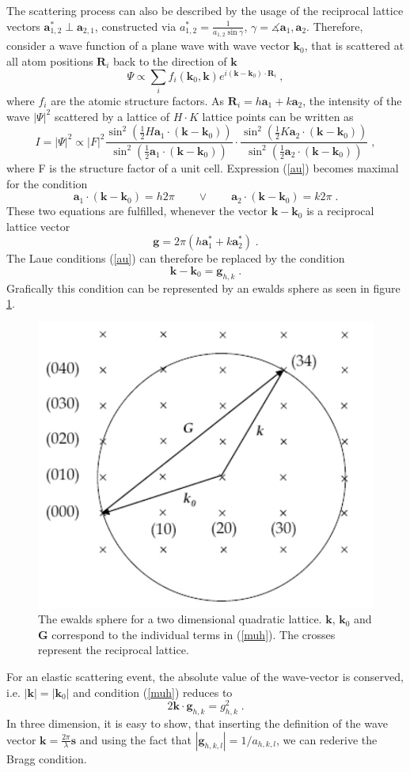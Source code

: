 \documentclass[a4paper]{scrartcl}
\numberwithin{equation}{section}
\numberwithin{figure}{section}
\numberwithin{table}{section}
\newcommand{\eq}[2]{\begin{equation}#1\label{#2}\end{equation}}
\newcommand{\Formel}[1]{(\ref{#1})}
\newcommand{\ve}[1]{\mathbf{ #1} }
\begin{document}
The scattering process can also be described by the usage of the reciprocal lattice vectors $\ve a_{1,2}^* \perp \ve a_{2,1}$, constructed via
$a_{1,2}^*=\frac{1}{a_{1,2} \sin \gamma} $, $\gamma = \measuredangle \ve a_1, \ve a_2 $. Therefore, consider a wave function of a plane wave with wave vector $\ve k_0$, that is scattered at all atom positions $\ve R_i$ back to the direction of $\ve k$ 
\eq{\Psi \propto \sum_{i} f_i(\ve k_0, \ve k) e^{i(\ve k - \ve k_0) \cdot \ve R_i} \ ,}{}
where $f_i$ are the atomic structure factors. As $\ve R_i=h \ve a_1 + k \ve a_2$, the intensity of the wave $|\Psi|^2$ scattered by a lattice of $H \cdot K$ lattice points can be written as
\eq{I=|\Psi|^2 \propto |F|^2 \frac{\sin^2 \left( \tfrac 1 2 H \ve a_1 \cdot (\ve k - \ve k_0) \right)}{\sin^2 \left( \tfrac 1 2 \ve a_1 \cdot ( \ve k - \ve k_0 ) \right)} \cdot \frac{\sin^2 \left( \tfrac 1 2 K \ve a_2 \cdot (\ve k - \ve k_0) \right)} {\sin^2 \left( \tfrac 1 2 \ve a_2 \cdot ( \ve k - \ve k_0 ) \right)} \; , } {au}
where F is the structure factor of a unit cell. Expression \Formel{au} becomes  maximal for the condition
\eq{\ve a_1 \cdot (\ve k - \ve k_0) = h 2 \pi \qquad \vee \qquad \ve a_2 \cdot (\ve k - \ve k_0) = k 2 \pi \;.}{}
These two equations are fulfilled, whenever the vector $\ve k - \ve k_0$ is a reciprocal lattice vector
\eq{\ve g = 2 \pi (h \ve a_1^{*} + k \ve a_2^*) \; .}{}
The Laue conditions \Formel{au} can therefore be replaced by the condition
\eq{\ve k - \ve k_0 =\ve g_{h,k} \;.}{muh}
Grafically this condition can be represented by an ewalds sphere as seen in figure \ref{fig:ewald}.
\begin{figure}
  \centering
   	\includegraphics[width=0.5\linewidth]{pic/ewald.pdf}
 		\caption{ \small The ewalds sphere for a two dimensional quadratic lattice. $\ve k$, $\ve k_0$ and $\ve G$ correspond to the individual terms in \Formel{muh}. The crosses represent the reciprocal lattice.  }
      \label{fig:ewald}
\end{figure}
For an elastic scattering event, the absolute value of the wave-vector is conserved, i.e. $|\ve k|=|\ve k_0|$ and condition \Formel{muh} reduces to
\eq{2\ve k \cdot \ve g_{h,k} = g_{h,k}^2 \; .}{}
In three dimension, it is easy to show, that inserting the definition of the wave vector $\ve k=\frac{2\pi}{\lambda} \ve s$ and using the fact that $|\ve g_{h,k,l}| = 1/a_{h,k,l}$, we can rederive the Bragg condition. 
\end{document}
